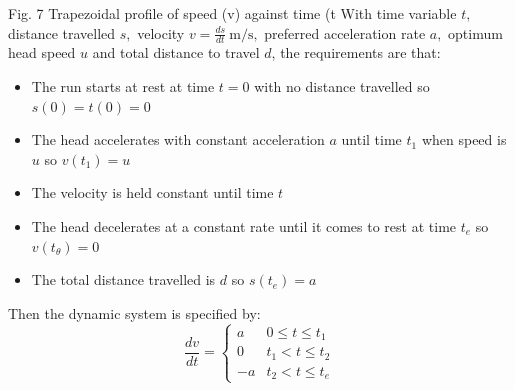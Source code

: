 \documentclass{UoNMCHA}
\numberwithin{equation}{section}
\begin{document}
	Fig. 7 Trapezoidal profile of speed (v) against time (t
	With time variable $t,$ distance travelled $s,$ velocity $v=\frac{d s}{d t} \mathrm{~m} / \mathrm{s},$ preferred acceleration rate $a,$ optimum
	head speed $u$ and total distance to travel $d$, the requirements are that:
	\begin{itemize}
		\item The run starts at rest at time $t=0$ with no distance travelled so $s(0)=t(0)=0$
		\item The head accelerates with constant acceleration $a$ until time $t_{1}$ when speed is $u$ so $v\left(t_{1}\right)=u$
		\item The velocity is held constant until time $t$
		\item The head decelerates at a constant rate until it comes to rest at time $t_{e}$ so $v\left(t_{\theta}\right)=0$
		\item The total distance travelled is $d$ so $s\left(t_{e}\right)=a$
	\end{itemize}
	
	Then the dynamic system is specified by:
	$$
	\frac{d v}{d t}=\left\{\begin{array}{ll}
	a & 0 \leq t \leq t_{1} \\
	0 & t_{1}<t \leq t_{2} \\
	-a & t_{2}<t \leq t_{e}
	\end{array}\right.
	$$
	
\end{document}
